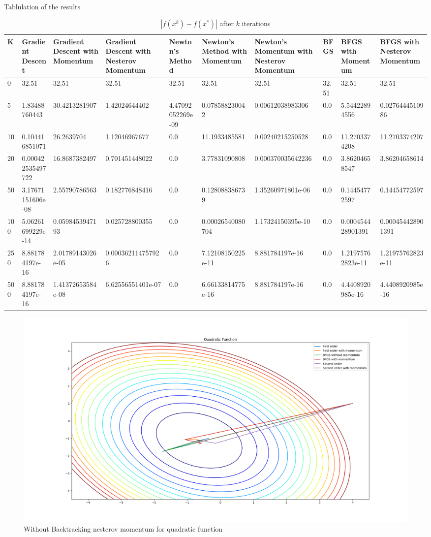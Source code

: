\documentclass{article}
\begin{document}
Tablulation of the results

\begin{table}[H]
	\centering
	\caption{$ | f(x^k) - f(x^*) | $ after $k$ iterations}
	\label{Quadratic function table}
	\begin{tabular}{|l|l|l|l|l|l|l|l|l|l|}
		\hline
		K & Gradient Descent & Gradient Descent with Momentum & Gradient Descent with Nesterov Momentum & Newton's Method & Newton's Method with Momentum & Newton's Momentum with Nesterov Momentum & BFGS & BFGS with Momentum & BFGS with Nesterov Momentum \\
		\hline
		0 & 32.51 & 32.51 & 32.51 & 32.51 & 32.51 & 32.51 & 32.51 & 32.51 & 32.51 \\
		\hline
		5 & 1.83488760443 & 30.4213281907 & 1.42024644402 & 4.47092052269e-09 & 0.078588230042 & 0.00612038983306 & 0.0 & 5.54422894556 & 0.0276444510986 \\
		\hline
		10 & 0.104416851071 & 26.2639704 & 1.12046967677 & 0.0 & 11.1933485581 & 0.00240215250528 & 0.0 & 11.2703374208 & 11.2703374207 \\
		\hline
		20 & 0.000422535497722 & 16.8687382497 & 0.701451448022 & 0.0 & 3.77831090808 & 0.000370035642236 & 0.0 & 3.86204658547 & 3.86204658614 \\
		\hline
		50 & 3.17671151606e-08 & 2.55790786563 & 0.182776848416 & 0.0 & 0.128088386739 & 1.35260971801e-06 & 0.0 & 0.14454772597 & 0.14454772597 \\
		\hline
		100 & 5.06261699229e-14 & 0.0598453947193 & 0.025728800355 & 0.0 & 0.00026540080704 & 1.17324150395e-10 & 0.0 & 0.000454428901391 & 0.000454428901391 \\
		\hline
		250 & 8.881784197e-16 & 2.01789143026e-05 & 0.000362114757926 & 0.0 & 7.12108150225e-11 & 8.881784197e-16 & 0.0 & 1.21975762823e-11 & 1.21975762823e-11 \\
		\hline
		500 & 8.881784197e-16 & 1.41372653584e-08 & 6.62556551401e-07 & 0.0 & 6.66133814775e-16 & 8.881784197e-16 & 0.0 & 4.4408920985e-16 & 4.4408920985e-16 \\
		\hline
	\end{tabular}
\end{table}

\begin{figure}[H]
	\includegraphics[width=\linewidth]{../Images/quadraticnesterovbacktrack.png}
	\caption{Without Backtracking nesterov momentum for quadratic function}
	\label{fig:With Backtracking nesterov momentum for quadratic function}
\end{figure}
\end{document}
